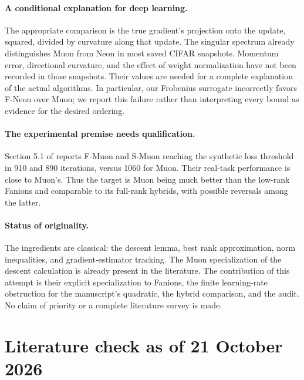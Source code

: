 \documentclass[11pt]{article}
\begin{document}
\paragraph{A conditional explanation for deep learning.}
The appropriate comparison is the true gradient's projection onto the update,
squared, divided by curvature along that update. The singular spectrum already
distinguishes Muon from Neon in most saved CIFAR snapshots. Momentum error,
directional curvature, and the effect of weight normalization have not been
recorded in those snapshots. Their values are needed for a complete
explanation of the actual algorithms. In particular, our Frobenius surrogate
incorrectly favors F-Neon over Muon; we report this failure rather than
interpreting every bound as evidence for the desired ordering.

\paragraph{The experimental premise needs qualification.}
Section 5.1 of  reports F-Muon and S-Muon
reaching the synthetic loss threshold in 910 and 890 iterations, versus 1060
for Muon. Their real-task performance is close to Muon's. Thus the target is
Muon being much better than the low-rank Fanions and comparable to its full-rank
hybrids, with possible reversals among the latter.

\paragraph{Status of originality.}
The ingredients are classical: the descent lemma, best rank approximation,
norm inequalities, and gradient-estimator tracking. The Muon specialization
of the descent calculation is already present in the literature. The
contribution of this attempt is their explicit specialization to Fanions,
the finite learning-rate obstruction for the manuscript's quadratic, the
hybrid comparison, and the audit. No claim of priority or a complete
literature survey is made.

\section{Literature check as of 21 October 2026}\label{sec:literature}
\end{document}
